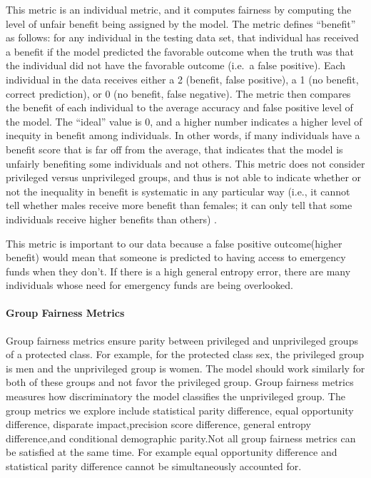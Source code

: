 \documentclass[water,article,submit,moreauthors,pdftex]{mdpi}
\begin{document}
This metric is an individual metric, and it computes fairness by
computing the level of unfair benefit being assigned by the model. The
metric defines ``benefit'' as follows: for any individual in the testing
data set, that individual has received a benefit if the model predicted
the favorable outcome when the truth was that the individual did not
have the favorable outcome (i.e.~a false positive). Each individual in
the data receives either a 2 (benefit, false positive), a 1 (no benefit,
correct prediction), or 0 (no benefit, false negative). The metric then
compares the benefit of each individual to the average accuracy and
false positive level of the model. The ``ideal'' value is 0, and a
higher number indicates a higher level of inequity in benefit among
individuals. In other words, if many individuals have a benefit score
that is far off from the average, that indicates that the model is
unfairly benefiting some individuals and not others. This metric does
not consider privileged versus unprivileged groups, and thus is not able
to indicate whether or not the inequality in benefit is systematic in
any particular way (i.e., it cannot tell whether males receive more
benefit than females; it can only tell that some individuals receive
higher benefits than others)
\citep{caton2020fairness, kypraiou_what_2021}.

This metric is important to our data because a false positive
outcome(higher benefit) would mean that someone is predicted to having
access to emergency funds when they don't. If there is a high general
entropy error, there are many individuals whose need for emergency funds
are being overlooked.

\hypertarget{group-fairness-metrics}{%
\paragraph{Group Fairness Metrics}\label{group-fairness-metrics}}

Group fairness metrics ensure parity between privileged and unprivileged
groups of a protected class. For example, for the protected class sex,
the privileged group is men and the unprivileged group is women. The
model should work similarly for both of these groups and not favor the
privileged group. Group fairness metrics measures how discriminatory the
model classifies the unprivileged
group\citep{binns2020apparent, mehrabi2021survey, caton2020fairness}.
The group metrics we explore include statistical parity difference,
equal opportunity difference, disparate impact,precision score
difference, general entropy difference,and conditional demographic
parity.Not all group fairness metrics can be satisfied at the same time.
For example equal opportunity difference and statistical parity
difference cannot be simultaneously accounted
for\citep{kypraiou_what_2021}.
\end{document}
